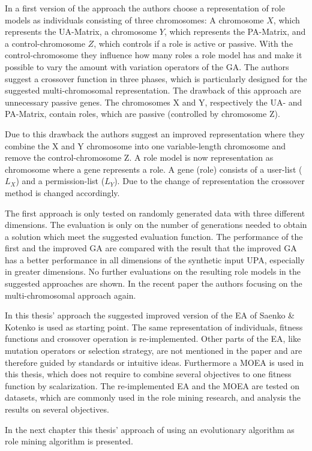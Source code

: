 In a first version of the approach the authors choose a representation of role models as individuals consisting of three chromosomes: A chromosome $X$, which represents the UA-Matrix, a chromosome $Y$, which represents the PA-Matrix, and a control-chromosome $Z$, which controls if a role is active or passive. With the control-chromosome they influence how many roles a role model has and make it possible to vary the amount with variation operators of the GA. The authors suggest a crossover function in three phases, which is particularly designed for the suggested multi-chromosomal representation. The drawback of this approach are unnecessary passive genes. The chromosomes X and Y, respectively the UA- and PA-Matrix, contain roles, which are passive (controlled by chromosome Z).

Due to this drawback the authors suggest an improved representation where they combine the X and Y chromosome into one variable-length chromosome and remove the control-chromosome Z. A role model is now representation as chromosome where a gene represents a role. A gene (role) consists of a user-list ($L_X$) and a permission-list ($L_Y$). Due to the change of representation the crossover method is changed accordingly.

The first approach is only tested on randomly generated data with three different dimensions\cite{Igor}. The evaluation is only on the number of generations needed to obtain a solution which meet the suggested evaluation function. The performance of the first and the improved GA are compared with the result that the improved GA has a better performance in all dimensions of the synthetic input UPA, especially in greater dimensions\cite{saenko2012design}. No further evaluations on the resulting role models in the suggested approaches are shown. In the recent paper \cite{Kotenko:2015} the authors focusing on the multi-chromosomal approach again.

In this thesis' approach the suggested improved version of the EA of Saenko \& Kotenko\cite{saenko2012design} is used as starting point. The same representation of individuals, fitness functions and crossover operation is re-implemented. Other parts of the EA, like mutation operators or selection strategy, are not mentioned in the paper and are therefore guided by standards or intuitive ideas. Furthermore a MOEA is used in this thesis, which does not require to combine several objectives to one fitness function by scalarization. The re-implemented EA and the MOEA are tested on datasets, which are commonly used in the role mining research, and analysis the results on several objectives.

\hfill \break
In the next chapter this thesis' approach of using an evolutionary algorithm as role mining algorithm is presented.